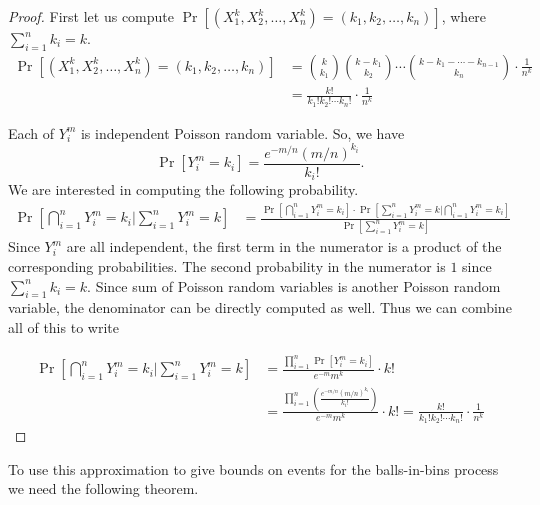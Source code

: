 \begin{proof}
  First let us compute $\Pr[(X_1^k,X_2^k,\ldots,X_n^k)=(k_1,k_2,\ldots,k_n)]$,
  where $\sum_{i=1}^n k_i = k$.
  \begin{align*}
    \Pr[(X_1^k,X_2^k,\ldots,X_n^k)=(k_1,k_2,\ldots,k_n)] &= \binom{k}{k_1} \binom{k-k_1}{k_2} \cdots \binom{k-k_1-\cdots-k_{n-1}}{k_n} \cdot \frac{1}{n^k}\\
    &= \frac{k!}{k_1! k_2! \cdots k_n!} \cdot \frac{1}{n^k}
  \end{align*}

  Each of $Y_i^m$ is independent Poisson random variable. So, we have
  $$\Pr[Y_i^m = k_i] = \frac{e^{-m/n} (m/n)^{k_i}}{k_i!}.$$
  We are interested in computing the following probability.
  \begin{align*}
    \Pr\left[ \bigcap_{i=1}^nY_i^m = k_i \Big| \sum_{i=1}^n Y_i^m = k\right] &= \frac{\Pr\left[\bigcap_{i=1}^nY_i^m = k_i \right]\cdot \Pr\left[\sum_{i=1}^n Y_i^m = k \Big| \bigcap_{i=1}^nY_i^m = k_i  \right]}{\Pr\left[\sum_{i=1}^n Y_i^m = k \right]}
  \end{align*}
  Since $Y_i^m$ are all independent, the first term in the numerator is a
  product of the corresponding probabilities. The second probability in the
  numerator is $1$ since $\sum_{i=1}^n k_i = k$. Since sum of Poisson random
  variables is another Poisson random variable, the denominator can be directly
  computed as well. Thus we can combine all of this to write

  \begin{align*}
    \Pr\left[ \bigcap_{i=1}^nY_i^m = k_i \Big| \sum_{i=1}^n Y_i^m = k\right] &= \frac{\prod_{i=1}^n \Pr\left[Y_i^m = k_i \right]}{e^{-m}m^k} \cdot k!\\
    &= \frac{\prod_{i=1}^n\left( \frac{e^{-m/n} (m/n)^{k_i}}{k_i!}\right) }{e^{-m}m^k} \cdot k! = \frac{k!}{k_1! k_2! \cdots k_n!} \cdot \frac{1}{n^k}
  \end{align*}
\end{proof}

To use this approximation to give bounds on events for the balls-in-bins process
we need the following theorem.

